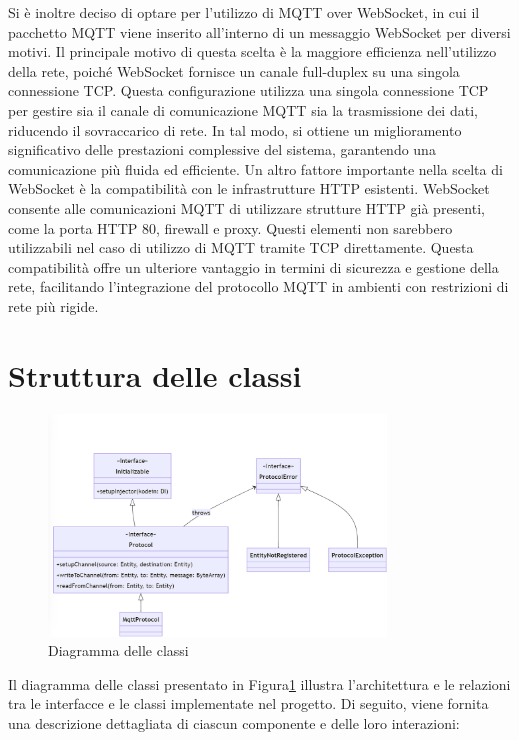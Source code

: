 \documentclass[12pt,a4paper,openright,twoside]{book}
\begin{document}
Si è inoltre deciso di optare per l'utilizzo di \ac{MQTT} over WebSocket, in cui il pacchetto \ac{MQTT} viene inserito all'interno di un messaggio WebSocket per diversi motivi.
Il principale motivo di questa scelta è la maggiore efficienza nell'utilizzo della rete, poiché WebSocket fornisce un canale full-duplex su una singola connessione \ac{TCP}. 
Questa configurazione utilizza una singola connessione TCP per gestire sia il canale di comunicazione MQTT sia la trasmissione dei dati, riducendo il sovraccarico di rete. 
In tal modo, si ottiene un miglioramento significativo delle prestazioni complessive del sistema, garantendo una comunicazione più fluida ed efficiente.
Un altro fattore importante nella scelta di WebSocket è la compatibilità con le infrastrutture HTTP esistenti. WebSocket consente alle comunicazioni \ac{MQTT} 
di utilizzare strutture HTTP già presenti, come la porta HTTP 80, firewall e proxy. Questi elementi non sarebbero utilizzabili nel caso di utilizzo di \ac{MQTT} tramite 
\ac{TCP} direttamente. Questa compatibilità offre un ulteriore vantaggio in termini di sicurezza e gestione della rete, facilitando l'integrazione del protocollo \ac{MQTT} 
in ambienti con restrizioni di rete più rigide.

\section{Struttura delle classi}

\begin{figure}[h]
    \centering
    \includegraphics[width=0.8\textwidth]{figures/class-diagram.png}
    \caption{Diagramma delle classi}
    \label{fig:class-diagram}
\end{figure}

Il diagramma delle classi presentato in Figura\ref{fig:class-diagram} illustra l'architettura e le relazioni tra le interfacce e le classi implementate nel progetto. 
Di seguito, viene fornita una descrizione dettagliata di ciascun componente e delle loro interazioni:
\end{document}
